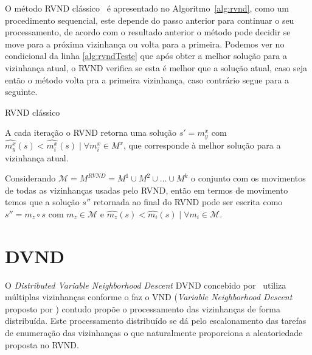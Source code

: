 O método RVND clássico~\cite{souza2010} é apresentado no Algoritmo~\ref{alg:rvnd}, como um procedimento sequencial, este depende do passo anterior para continuar o seu processamento, de acordo com o resultado anterior o método pode decidir se move para a próxima vizinhança ou volta para a primeira.
Podemos ver no condicional da linha \ref{alg:rvndTeste} que após obter a melhor solução para a vizinhança atual, o RVND verifica se esta é melhor que a solução atual, caso seja então o método volta pra a primeira vizinhança, caso contrário segue para a seguinte.

\begin{algorithm}[htpb]
\caption{RVND clássico}
\label{alg:rvnd}
\begin{algorithmic}[1]
         
             
            
             \label{alg:rvndTeste}
            \Else
            \EndIf
        \EndFor
    \EndFunction
\end{algorithmic}
\end{algorithm}

A cada iteração o RVND retorna uma solução $s' = m_y^x$ com $\widehat{m_y^x}(s) < \widehat{m_i^x}(s) \mid \forall m_i^x \in M^x$, que corresponde à melhor solução para a vizinhança atual.

Considerando $ \mathcal{M} = M^{RVND} = M^1 \cup M^2 \cup \dots \cup M^k $ o conjunto com os movimentos de todas as vizinhanças usadas pelo RVND, então em termos de movimento temos que a solução $s''$ retornada ao final do RVND pode ser escrita como $s'' = m_z \circ s$ com $m_z \in \mathcal{M}$ e $\widehat{m_z}(s) < \widehat{m_i}(s) \mid \forall m_i \in \mathcal{M}$.

\section{DVND} \label{sec:dvndClassico}

O \textit{Distributed Variable Neighborhood Descent} DVND concebido por~\cite{RIOS201839} utiliza múltiplas vizinhanças conforme o faz o VND (\textit{Variable Neighborhood Descent} proposto por \cite{mladenovic1997}) contudo propõe o processamento das vizinhanças de forma distribuída.
Este processamento distribuído se dá pelo escalonamento das tarefas de enumeração das vizinhanças o que naturalmente proporciona a aleatoriedade proposta no RVND.

